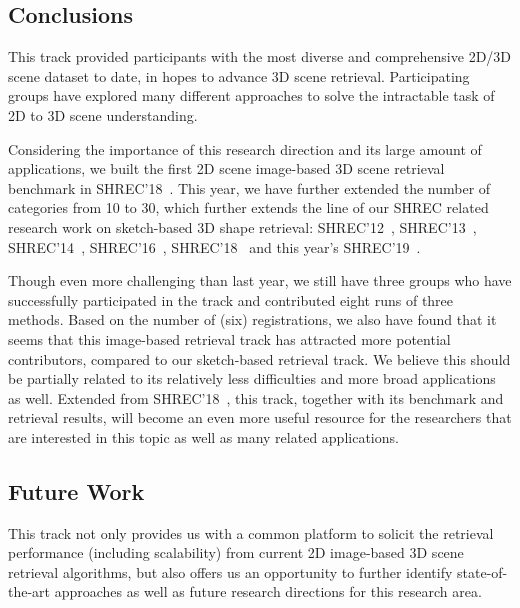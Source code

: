 \documentclass[../main.tex]{subfiles}
\begin{document}
\subsection{Conclusions}
This track provided participants with the most diverse and comprehensive 2D/3D scene dataset to date, in hopes to advance 3D scene retrieval. Participating groups have explored many different approaches to solve the intractable task of 2D to 3D scene understanding.

Considering the importance of this research direction and its large amount of applications, we built the first 2D scene image-based 3D scene retrieval benchmark in SHREC'18~\cite{SHREC18-SceneIBR-Track}. This year, we have further extended the number of categories from 10 to 30, which further extends the line of our SHREC related research work on sketch-based 3D shape retrieval: SHREC'12~\cite{DBLP:conf/3dor/LiSGABBCEFHHJKORSSYYY12, DBLP:journals/cviu/0013LGSBFFFJMOPS14}, SHREC'13~\cite{DBLP:conf/3dor/LiLGSAJST13, DBLP:journals/cviu/0013LGSBFFFJMOPS14}, SHREC'14~\cite{DBLP:conf/3dor/LiLLGSABFFJLOTZ14, DBLP:journals/cviu/LiLLGSABCCFFFLLJKKOTWZZ15}, SHREC'16~\cite{DBLP:conf/3dor/0013LDDFQLLLLOT16}, SHREC'18~\cite{SHREC18-SceneIBR-Track} and this year's SHREC'19~\cite{SceneIBR19}.

Though even more challenging than last year, we still have three groups who have successfully participated in the track and contributed eight runs of three methods. Based on the number of (six) registrations, we also have found that it seems that this image-based retrieval track has attracted more potential contributors, compared to our sketch-based retrieval track. We believe this should be partially related to its relatively less difficulties and more broad applications as well. Extended from SHREC'18~\cite{SHREC18-SceneIBR-Track}, this track, together with its benchmark and retrieval results, will become an even more useful resource for the researchers that are interested in this topic as well as many related applications.


\subsection{Future Work}
This track not only provides us with a common platform to solicit the retrieval performance (including scalability) from current 2D image-based 3D scene retrieval algorithms, but also offers us an opportunity to further identify state-of-the-art approaches as well as future research directions for this research area.
\end{document}
